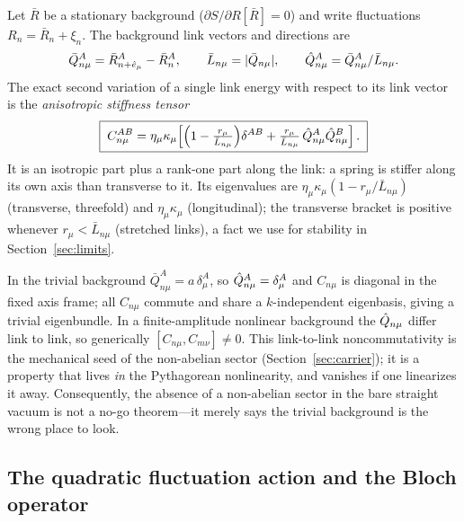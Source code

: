 Let $\bar R$ be a stationary background ($\partial S/\partial R[\bar R]=0$) and write
fluctuations $R_n=\bar R_n+\xi_n$. The background link vectors and directions are
\begin{equation}
  \bar Q_{n\mu}^A=\bar R_{n+\hat e_\mu}^A-\bar R_n^A,\qquad
  \bar L_{n\mu}=|\bar Q_{n\mu}|,\qquad
  \hat{Q}_{n\mu}^A=\bar Q_{n\mu}^A/\bar L_{n\mu}.
\end{equation}
The exact second variation of a single link energy with respect to its link vector is the
\emph{anisotropic stiffness tensor}
\begin{equation}
  \boxed{\;
  C_{n\mu}^{AB}
  = \eta_\mu\kappa_\mu\!\left[
      \Bigl(1-\tfrac{r_\mu}{\bar L_{n\mu}}\Bigr)\delta^{AB}
      + \tfrac{r_\mu}{\bar L_{n\mu}}\,\hat{Q}_{n\mu}^A\hat{Q}_{n\mu}^B
    \right].
  \;}
  \label{eq:stiffness}
\end{equation}
It is an isotropic part plus a rank-one part along the link: a spring is stiffer along its
own axis than transverse to it. Its eigenvalues are $\eta_\mu\kappa_\mu(1-r_\mu/\bar L_{n\mu})$
(transverse, threefold) and $\eta_\mu\kappa_\mu$ (longitudinal); the transverse bracket is
positive whenever $r_\mu<\bar L_{n\mu}$ (stretched links), a fact we use for stability in
Section~\ref{sec:limits}.

In the trivial background $\bar Q_{n\mu}^A=a\,\delta_\mu^A$, so $\hat{Q}_{n\mu}^A=\delta_\mu^A$
and $C_{n\mu}$ is diagonal in the fixed axis frame; all $C_{n\mu}$ commute and share a
$k$-independent eigenbasis, giving a trivial eigenbundle. In a finite-amplitude nonlinear
background the $\hat{Q}_{n\mu}$ differ link to link, so generically
$[C_{n\mu},C_{m\nu}]\neq 0$. This link-to-link noncommutativity is the mechanical seed of
the non-abelian sector (Section~\ref{sec:carrier}); it is a property that lives \emph{in}
the Pythagorean nonlinearity, and vanishes if one linearizes it away. Consequently, the
absence of a non-abelian sector in the bare straight vacuum is not a no-go theorem---it
merely says the trivial background is the wrong place to look.

\subsection{The quadratic fluctuation action and the Bloch operator}
\label{subsec:bloch}

